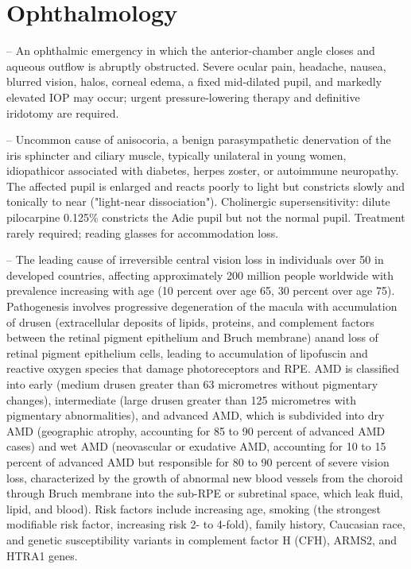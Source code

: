 \chapter{Ophthalmology}

-- An ophthalmic emergency in which the anterior-chamber angle closes and aqueous outflow is abruptly obstructed. Severe ocular pain, headache, nausea, blurred vision, halos, corneal edema, a fixed mid-dilated pupil, and markedly elevated IOP may occur; urgent pressure-lowering therapy and definitive iridotomy are required.

-- Uncommon cause of anisocoria, a benign parasympathetic denervation of the iris sphincter and ciliary muscle, typically unilateral in young women, idiopathicor associated with diabetes, herpes zoster, or autoimmune neuropathy. The affected pupil is enlarged and reacts poorly to light but constricts slowly and tonically to near ("light-near dissociation"). Cholinergic supersensitivity: dilute pilocarpine 0.125\% constricts the Adie pupil but not the normal pupil. Treatment rarely required; reading glasses for accommodation loss.

-- The leading cause of irreversible central vision loss in individuals over 50 in developed countries, affecting approximately 200 million people worldwide with prevalence increasing with age (10 percent over age 65, 30 percent over age 75). Pathogenesis involves progressive degeneration of the macula with accumulation of drusen (extracellular deposits of lipids, proteins, and complement factors between the retinal pigment epithelium and Bruch membrane) anand loss of retinal pigment epithelium cells, leading to accumulation of lipofuscin and reactive oxygen species that damage photoreceptors and RPE. AMD is classified into early (medium drusen greater than 63 micrometres without pigmentary changes), intermediate (large drusen greater than 125 micrometres with pigmentary abnormalities), and advanced AMD, which is subdivided into dry AMD (geographic atrophy, accounting for 85 to 90 percent of advanced AMD cases) and wet AMD (neovascular or exudative AMD, accounting for 10 to 15 percent of advanced AMD but responsible for 80 to 90 percent of severe vision loss, characterized by the growth of abnormal new blood vessels from the choroid through Bruch membrane into the sub-RPE or subretinal space, which leak fluid, lipid, and blood). Risk factors include increasing age, smoking (the strongest modifiable risk factor, increasing risk 2- to 4-fold), family history, Caucasian race, and genetic susceptibility variants in complement factor H (CFH), ARMS2, and HTRA1 genes.

